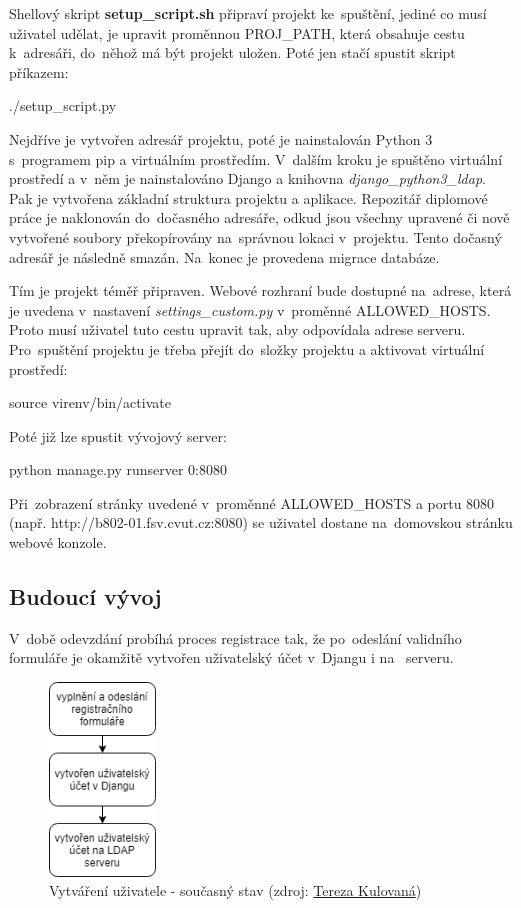 Shellový skript \textbf{setup\_script.sh} připraví projekt 
ke~spuštění, jediné co musí uživatel udělat, je upravit proměnnou
\textsf{PROJ\_PATH}, která obsahuje cestu k~adresáři, do~něhož má být
projekt uložen. Poté jen stačí spustit skript příkazem:
\begin{center}
\textsf{./setup\_script.py}
\end{center}
Nejdříve je vytvořen adresář projektu, poté je nainstalován Python 3 
s~programem pip a virtuálním prostředím. V~dalším kroku je spuštěno
virtuální prostředí a v~něm je nainstalováno Django a knihovna
\textit{django\_python3\_ldap}. Pak je vytvořena základní struktura
projektu a aplikace. Repozitář diplomové práce je naklonován 
do~dočasného adresáře, odkud jsou všechny upravené či nově vytvořené
soubory překopírovány na~správnou lokaci v~projektu. Tento dočasný
adresář je následně smazán. Na~konec je provedena migrace databáze.

Tím je projekt téměř připraven. Webové rozhraní bude dostupné 
na~adrese, která je uvedena v~nastavení \textit{settings\_custom.py} 
v~proměnné \textsf{ALLOWED\_HOSTS}. Proto musí uživatel tuto cestu
upravit tak, aby odpovídala adrese serveru. Pro~spuštění projektu je
třeba přejít do~složky projektu a aktivovat virtuální prostředí:
\begin{center}
\textsf{source virenv/bin/activate}
\end{center}

\newpage
Poté již lze spustit vývojový server:

\begin{center}
\textsf{python manage.py runserver 0:8080}
\end{center}

Při~zobrazení stránky uvedené v~proměnné \textsf{ALLOWED\_HOSTS} a
portu 8080 (např. http://b802-01.fsv.cvut.cz:8080) se uživatel dostane
na~domovskou stránku webové konzole.

\subsection{Budoucí vývoj}
\label{python-knihovna}

V~době odevzdání probíhá proces registrace tak, že po~odeslání
validního formuláře je okamžitě vytvořen uživatelský účet v~Djangu i
na~ serveru.

\begin{figure}[H] \centering
    \includegraphics[width=80pt]{./pictures/my_console_current_version_cz.png}
    \caption[Vytváření uživatele - současný stav]{Vytváření uživatele - současný stav (zdroj:
	\href{}{Tereza Kulovaná})}
    \label{fig:admin-current}
\end{figure}
  

